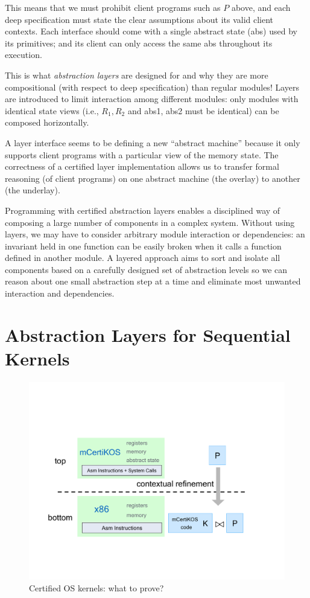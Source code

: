 This means that we must prohibit client programs such as $P$ above,
and each deep specification must state the clear assumptions about its
valid client contexts. Each interface should come with a single
abstract state (\textsf{abs}) used by its primitives; and its client can
only access the same \textsf{abs} throughout its execution. 

This is what {\em abstraction layers} are designed for and why they
are more compositional (with respect to deep specification)
than regular modules! Layers are introduced to limit 
interaction among different modules: only modules with identical
state views (i.e., $R_1, R_2$ and \textsf{abs1},
\textsf{abs2} must be identical) can be composed horizontally.
 
A layer interface seems to be defining a new ``abstract machine''
because it only supports client programs with a particular view of the
memory state. The correctness of a certified layer implementation
allows us to transfer formal reasoning (of client programs) on one
abstract machine (the overlay) to another (the underlay).  

Programming with certified abstraction layers enables a disciplined way of
composing a large number of components in a complex system. Without
using layers, we may have to consider arbitrary module interaction or
dependencies: an invariant held in one function can be easily broken
when it calls a function defined in another module. A layered approach
aims to sort and isolate all components based on a carefully designed
set of abstraction levels so we can reason about one small abstraction
step at a time and eliminate most unwanted interaction and dependencies.



\section{Abstraction Layers for Sequential Kernels}
\label{sec:seq:overview}

\begin{figure}[tb] \centering
\includegraphics[scale=.5]{figs/mainthm}
\caption{Certified OS kernels: what to prove?}
\hrulefill
\label{fig:mainthm}
\end{figure}

